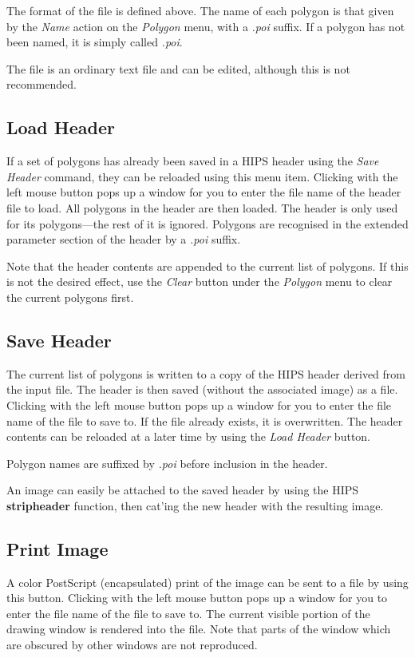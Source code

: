 The format of the file is defined above. The name of each polygon is that given by the {\it Name\/} action on the {\it Polygon\/} menu, with a {\it .poi\/} suffix. If a polygon has not been named, it is simply called {\it .poi\/}.

The file is an ordinary text file and can be edited, although this is not recommended.

\subsection{Load Header}
If a set of polygons has already been saved in a HIPS header using the {\it Save Header\/} command, they can be reloaded using this menu item. Clicking with the left mouse button pops up a window for you to enter the file name of the header file to load. All polygons in the header are then loaded. The header is only used for its polygons---the rest of it is ignored. Polygons are recognised in the extended parameter section of the header by a {\it .poi\/} suffix.

Note that the header contents are appended to the current list of polygons. If this is not the desired effect, use the {\it Clear\/} button under the {\it Polygon\/} menu to clear the current polygons first.

\subsection{Save Header}
The current list of polygons is written to a copy of the HIPS header derived from the input file. The header is then saved (without the associated image) as a file. Clicking with the left mouse button pops up a window for you to enter the file name of the file to save to. If the file already exists, it is overwritten. The header contents can be reloaded at a later time by using the {\it Load Header\/} button.

Polygon names are suffixed by {\it .poi\/} before inclusion in the header.

An image can easily be attached to the saved header by using the HIPS {\bf stripheader} function, then cat'ing the new header with the resulting image.

\subsection{Print Image}
A color PostScript (encapsulated) print of the image can be sent to a file by using this button. Clicking with the left mouse button pops up a window for you to enter the file name of the file to save to. The current visible portion of the drawing window is rendered into the file. Note that parts of the window which are obscured by other windows are not reproduced.


